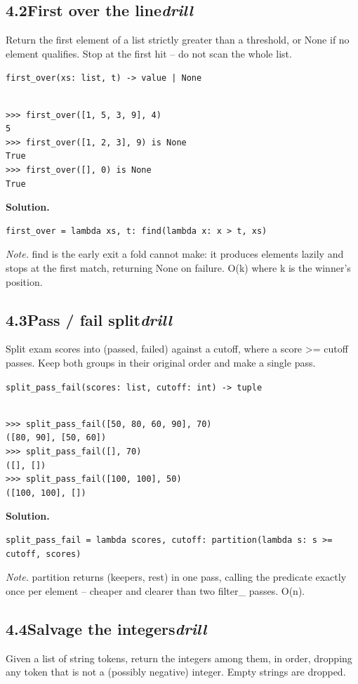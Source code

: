 \documentclass[10pt,letterpaper]{book}
\begin{document}
\subsection*{4.2\quad First over the line\hfill\textnormal{\textit{drill}}}
Return the first element of a list strictly greater than a threshold, or None if no element qualifies. Stop at the first hit -- do not scan the whole list.

\noindent\texttt{first\_over(xs: list, t) -> value | None}
\begin{lstlisting}[style=ex]

>>> first_over([1, 5, 3, 9], 4)
5
>>> first_over([1, 2, 3], 9) is None
True
>>> first_over([], 0) is None
True

\end{lstlisting}
\noindent\textbf{Solution.}
\begin{lstlisting}[style=code]
first_over = lambda xs, t: find(lambda x: x > t, xs)
\end{lstlisting}
\noindent\textit{Note.} find is the early exit a fold cannot make: it produces elements lazily and stops at the first match, returning None on failure. O(k) where k is the winner's position.

\subsection*{4.3\quad Pass / fail split\hfill\textnormal{\textit{drill}}}
Split exam scores into (passed, failed) against a cutoff, where a score >= cutoff passes. Keep both groups in their original order and make a single pass.

\noindent\texttt{split\_pass\_fail(scores: list, cutoff: int) -> tuple}
\begin{lstlisting}[style=ex]

>>> split_pass_fail([50, 80, 60, 90], 70)
([80, 90], [50, 60])
>>> split_pass_fail([], 70)
([], [])
>>> split_pass_fail([100, 100], 50)
([100, 100], [])

\end{lstlisting}
\noindent\textbf{Solution.}
\begin{lstlisting}[style=code]
split_pass_fail = lambda scores, cutoff: partition(lambda s: s >= cutoff, scores)
\end{lstlisting}
\noindent\textit{Note.} partition returns (keepers, rest) in one pass, calling the predicate exactly once per element -- cheaper and clearer than two filter\_ passes. O(n).

\subsection*{4.4\quad Salvage the integers\hfill\textnormal{\textit{drill}}}
Given a list of string tokens, return the integers among them, in order, dropping any token that is not a (possibly negative) integer. Empty strings are dropped.
\end{document}
